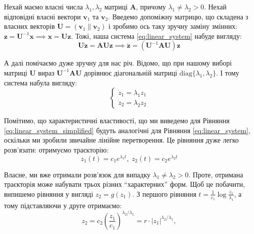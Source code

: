 \documentclass[oneside,solution]{tmpl}
\begin{document}
Нехай маємо власні числа $\lambda_1,\lambda_2$ матриці $\boldsymbol{A}$, причому $\lambda_1 \neq \lambda_2 > 0$. Нехай відповідні власні вектори $\mathbf{v}_1$ та $\mathbf{v}_2$. Введемо допоміжну матрицю, що складена з власних векторів $\boldsymbol{U} = (\mathbf{v}_1 \parallel \mathbf{v}_2)$ і зробимо ось таку зручну заміну змінних: $\mathbf{z} = \boldsymbol{U}^{-1}\mathbf{x} \implies \mathbf{x} = \boldsymbol{U}\mathbf{z}$. Тожі, наша система \ref{eq:linear_system} набуде вигляду:
\begin{equation}
    \boldsymbol{U}\dot{\mathbf{z}} = \boldsymbol{A}\boldsymbol{U}\mathbf{z} \implies \dot{\mathbf{z}} = (\boldsymbol{U}^{-1}\boldsymbol{AU})\mathbf{z}
\end{equation}

А далі помічаємо дуже зручну для нас річ. Відомо, що при нашому виборі матриці $\boldsymbol{U}$ вираз $\boldsymbol{U}^{-1}\boldsymbol{AU}$ дорівнює діагональній матриці $\text{diag}\{\lambda_1, \lambda_2 \}$. І тому система набула вигляду:
\begin{equation}\label{eq:linear_system_simplified}
    \begin{cases}
        \dot{z}_1 = \lambda_1 z_1 \\
        \dot{z}_2 = \lambda_2 z_2
    \end{cases}
\end{equation}

Помітимо, що характеристичні властивості, що ми виведемо для Рівняння \ref{eq:linear_system_simplified} будуть аналогічні для Рівняння \ref{eq:linear_system}, оскільки ми зробили звичайне лінійне перетворення. Це рівняння дуже легко розв'язати: отримуємо траєкторію:
\begin{equation}\label{eq:trajectory}
    z_1(t) = c_1e^{\lambda_1 t}, \; z_2(t) = c_2e^{\lambda_2 t}
\end{equation}

Власне, ми вже отримали розв'язок для випадку $\lambda_1 \neq \lambda_2 > 0$. Проте, отримана траєкторія може набувати трьох різних ``характерних'' форм. Щоб це побачити, випишемо рівняння у вигляді $z_2=g(z_1)$. З першого рівняння $t = \frac{1}{c_1}\log \frac{z_1}{\lambda_1}$, а тому підставляючи у друге отримаємо:
\begin{equation}
    z_2 = c_2 \left(\frac{z_1}{c_1}\right)^{\lambda_2 / \lambda_1} = r \cdot |z_1|^{\lambda_2/\lambda_1},
\end{equation}
\end{document}
